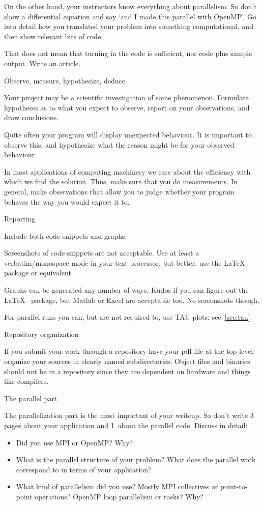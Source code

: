 On the other hand, your instructors know everything about parallelism.
So don't show a differential equation and say `and I made this parallel with OpenMP'.
Go into detail how you translated your problem into something computational,
and then show relevant bits of code.

That does not mean that turning in the code is sufficient, nor code plus sample output.
Write an article.

 {Observe, measure, hypothesize, deduce}

Your project may be a scientific investigation of some
phenomenon. Formulate hypotheses as to what you expect to observe,
report on your observations, and draw conclusions.

Quite often your program will display unexpected behaviour. It is important to observe
this, and hypothesize what the reason might be for your observed behaviour.

In most applications of computing machinery we care about the efficiency with which
we find the solution. Thus, make sure that you do measurements. In general, make
observations that allow you to judge whether your program behaves the way you
would expect it to.

 {Reporting}

Include both code snippets and graphs.

Screenshots of code snippets are not acceptable.
Use at least a verbatim/monospace mode in your text processor,
but better, use the \LaTeX\  package or equivalent.

Graphs can be generated any number of ways.
Kudos if you can figure out the \LaTeX\  package,
but Matlab or Excel are acceptable too.
No screenshots though.

For parallel runs you can, but are not required to,
use TAU plots; see~\ref{sec:tau}.

 {Repository organization}

If you submit your work through a repository
have your pdf file at the top level;
organize your sources in clearly named subdirectories.
Object files and binaries should not be in a repository
since they are dependent on hardware and things like compilers.

 {The parallel part}

The parallelization part is the most important of your writeup.
So don't write 3 pages about your application and 1~about the parallel code.
Discuss in detail:
\begin{itemize}
\item Did you use MPI or OpenMP? Why?
\item What is the parallel structure of your problem? What does the parallel work correspond
  to in terms of your application?
\item What kind of parallelism did you use? Mostly MPI collectives or point-to-point operations?
  OpenMP loop parallelism or tasks? Why?
\end{itemize}

